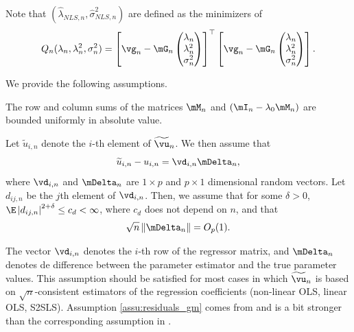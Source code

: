 \documentclass[english,12pt]{book}\usepackage[]{graphicx}\usepackage[]{xcolor}
\begin{document}
Note that $(\widehat{\lambda}_{NLS, n}, \widehat{\sigma}^2_{NLS, n})$ are defined as the minimizers of
\begin{equation}\label{eq:Qn-sem-mom}
Q_n(\lambda_n, \lambda^2_n, \sigma^2_n) = \left[\vg_n - \mG_n \begin{pmatrix}\lambda_n \\ \lambda ^2_n \\ \sigma^2_n\end{pmatrix}\right]^\top \left[\vg_n - \mG_n \begin{pmatrix}\lambda _n\\ \lambda ^2_n \\ \sigma^2_n\end{pmatrix}\right].
\end{equation}

We provide the following assumptions. 
\begin{assumption}\label{assu:bounded_matrix_M}
The row and column sums of the matrices $\mM_n$ and $(\mI_n - \lambda_0\mM_n)$ are bounded uniformly in absolute value.
\end{assumption}

\begin{assumption}\label{assu:residuals_gm}
Let $\widetilde{u}_{i, n}$ denote the $i$-th element of $\widetilde{\vu}_n$. We then assume that
\begin{equation*}
\widetilde{u}_{i, n} - u_{i,n} = \vd_{i,n}\mDelta_n, 
\end{equation*}
%
where $\vd_{i, n}$ and $\mDelta_n$ are $1\times p$ and $p\times 1$ dimensional random vectors. Let $d_{ij,n}$ be the $j$th element of $\vd_{i, n}$. Then, we assume that for some $\delta>0$, $\E\left|d_{ij,n}\right|^{2 + \delta}\leq c_{d} < \infty$, where $c_d$ does not depend on $n$, and that
\begin{equation}
\sqrt{n}\left\lVert \mDelta_n\right\rVert = O_p(1).
\end{equation}
\end{assumption}

The vector $\vd_{i, n}$ denotes the $i$-th row of the regressor matrix, and $\mDelta_n$ denotes de difference between the parameter estimator and the true parameter values. This assumption should be satisfied for most cases in which $\widetilde{\vu}_n$ is based on $\sqrt{n}$-consistent estimators of the regression coefficients (non-linear OLS, linear OLS, S2SLS). Assumption \ref{assu:residuals_gm} comes from \cite{kelejian2010specification} and is a bit stronger than the corresponding assumption in \cite{kelejian1999generalized}.
\end{document}
